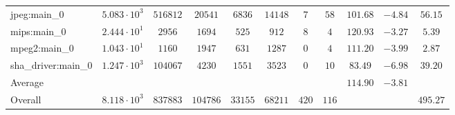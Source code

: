 \begin{tabular}{|l|c|c|c|c|c|c|c|c|c|c|}
jpeg:main\_0            & $ 5.083 \cdot 10^{3} $ & $ 516812 $ & $ 20541  $ & $ 6836  $ & $ 14148 $ & $ 7   $ & $ 58  $ & $ 101.68      $ & $ -4.84   $ & $ 56.15   $ \\
mips:main\_0            & $ 2.444 \cdot 10^{1} $ & $ 2956   $ & $ 1694   $ & $ 525   $ & $ 912   $ & $ 8   $ & $ 4   $ & $ 120.93      $ & $ -3.27   $ & $ 5.39    $ \\
mpeg2:main\_0           & $ 1.043 \cdot 10^{1} $ & $ 1160   $ & $ 1947   $ & $ 631   $ & $ 1287  $ & $ 0   $ & $ 4   $ & $ 111.20      $ & $ -3.99   $ & $ 2.87    $ \\
sha\_driver:main\_0     & $ 1.247 \cdot 10^{3} $ & $ 104067 $ & $ 4230   $ & $ 1551  $ & $ 3523  $ & $ 0   $ & $ 10  $ & $ 83.49       $ & $ -6.98   $ & $ 39.20   $ \\
\hline
Average                 & $                    $ & $        $ & $        $ & $       $ & $       $ & $     $ & $     $ & $ 114.90      $ & $ -3.81   $ & $         $ \\
\hline
Overall                 & $ 8.118 \cdot 10^{3} $ & $ 837883 $ & $ 104786 $ & $ 33155 $ & $ 68211 $ & $ 420 $ & $ 116 $ & $             $ & $         $ & $ 495.27  $ \\
\hline
\end{tabular}
